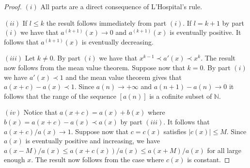 \documentclass[11pt]{amsart}
\renewcommand{\H}{\mathcal{H}}
\newcommand{\N}{\mathbb{N}}
\theoremstyle{plain}
\theoremstyle{definition}
\theoremstyle{remark}
\begin{document}
\begin{proof}
  $(i)$ All parts are a direct consequence of L'Hospital's rule.




  $(ii)$ If $l\leq k$ the result follows immediately from part $(i)$.
  If $l=k+1$ by part $(i)$ we have that $a^{(k+1)}(x)\to 0$ and
  $a^{(k+1)}(x)$ is eventually positive.  It follows that
  $a^{(k+1)}(x)$ is eventually decreasing.

  $(iii)$ Let $k\neq 0$. By part $(i)$ we have that $x^{k-1}\prec
  a'(x)\prec x^k$. The result now follows from the mean value theorem.
  Suppose now that $k=0$. By part $(i)$ we have $a'(x)\prec 1$ and the
  mean value theorem gives that $a(x+c)-a(x)\prec 1$. Since
  $a(n)\to+\infty$ and $a(n+1)-a(n)\to 0 $ it follows that the range
  of the sequence $[a(n)]$ is a cofinite subset of $\N$.

  $(iv)$ Notice that $a(x+c)=a(x)+b(x)$ where $b(x)=a(x+c)-a(x)\prec
  a(x)$ by part $(iii)$. It follows that $a(x+c)/a(x)\to 1$.
  Suppose now that $c=c(x)$ satisfies $|c(x)|\leq M$.  Since $a(x)$ is
  eventually positive and increasing, we have
   $ a(x-M)/a(x)\leq
  a(x+c(x))/a(x)\leq a(x+M)/a(x)$ for all large enough $x$. The result now follows from the
  case where $c(x)$ is constant.
\end{proof}
\end{document}
